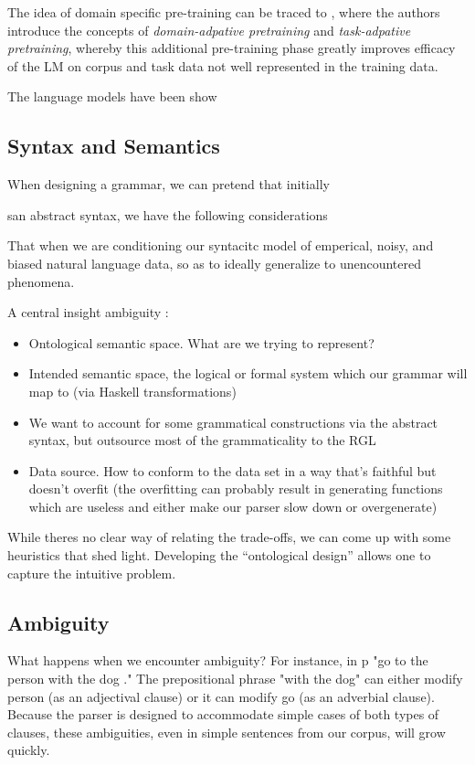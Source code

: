 \documentclass[a4paper, 11pt]{article}
\begin{document}
The idea of domain specific pre-training can be traced to
\cite{gururangan-etal-2020-dont}, where the authors introduce the concepts of
\emph{domain-adpative pretraining} and \emph{task-adpative pretraining}, whereby
this additional pre-training phase greatly improves efficacy of the LM on
corpus and task data not well represented in the training data.

The language models have been show \cite{bioBert}


\subsection{Syntax and Semantics}

When designing a grammar, we can pretend that initially

san abstract syntax, we have the following considerations

That when we are conditioning our syntacitc model of emperical, noisy, and
biased natural language data, so as to ideally generalize to unencountered
phenomena.

A central insight ambiguity : 


\begin{itemize}
\item Ontological semantic space. What are we trying to represent?
\item Intended semantic space, the logical or formal system which our grammar
  will map to (via Haskell transformations)
\item  We want to account for some grammatical constructions via the abstract syntax, but
  outsource most of the grammaticality to the RGL
\item Data source. How to conform to the data set in a way that's faithful but
  doesn't overfit (the overfitting can probably result in generating functions
  which are useless and either make our parser slow down or overgenerate)
\end{itemize}

While theres no clear way of relating the trade-offs, we can come up with some
heuristics that shed light. Developing the ``ontological design'' allows one to
capture the intuitive problem.


\subsection{Ambiguity}

What happens when we encounter ambiguity? For instance, in p "go to the person
with the dog ." The prepositional phrase "with the dog" can either modify person
(as an adjectival clause) or it can modify go (as an adverbial clause). Because
the parser is designed to accommodate simple cases of both types of clauses,
these ambiguities, even in simple sentences from our corpus, will grow quickly. 
\end{document}
